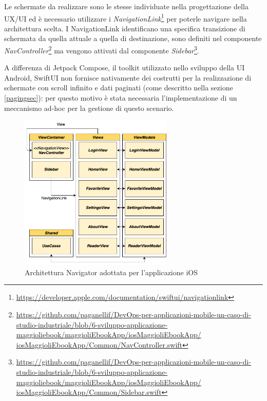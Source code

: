 Le schermate da realizzare sono le stesse individuate nella progettazione della UX/UI ed è necessario utilizzare i \textit{NavigationLink}\footnote{\href{https://developer.apple.com/documentation/swiftui/navigationlink}{https://developer.apple.com/documentation/swiftui/navigationlink}} per poterle navigare nella architettura scelta. I NavigationLink identificano una specifica transizione di schermata da quella attuale a quella di destinazione, sono definiti nel componente \textit{NavController}\footnote{\href{https://github.com/paganellif/DevOps-per-applicazioni-mobile-un-caso-di-studio-industriale/blob/6-sviluppo-applicazione-maggioliebook/maggioliEbookApp/iosMaggioliEbookApp/iosMaggioliEbookApp/Common/NavController.swift}{https://github.com/paganellif/DevOps-per-applicazioni-mobile-un-caso-di-studio-industriale/blob/6-sviluppo-applicazione-maggioliebook/maggioliEbookApp/iosMaggioliEbookApp/\\iosMaggioliEbookApp/Common/NavController.swift}} ma vengono attivati dal componente \textit{Sidebar}\footnote{\href{https://github.com/paganellif/DevOps-per-applicazioni-mobile-un-caso-di-studio-industriale/blob/6-sviluppo-applicazione-maggioliebook/maggioliEbookApp/iosMaggioliEbookApp/iosMaggioliEbookApp/Common/Sidebar.swift}{https://github.com/paganellif/DevOps-per-applicazioni-mobile-un-caso-di-studio-industriale/blob/6-sviluppo-applicazione-maggioliebook/maggioliEbookApp/iosMaggioliEbookApp/\\iosMaggioliEbookApp/Common/Sidebar.swift}}.

A differenza di Jetpack Compose, il toolkit utilizzato nello sviluppo della UI Android, SwiftUI non fornisce nativamente dei costrutti per la realizzazione di schermate con scroll infinito e dati paginati (come descritto nella sezione \ref{pagingsec}): per questo motivo è stata necessaria l'implementazione di un meccanismo ad-hoc per la gestione di questo scenario.

\begin{figure}[H]
\centering
    \includegraphics[width=0.65\textwidth]{img/navigator-arch-ios.png}
    \caption{Architettura Navigator adottata per l'applicazione iOS}
    \label{iosarchapp}
\end{figure}

